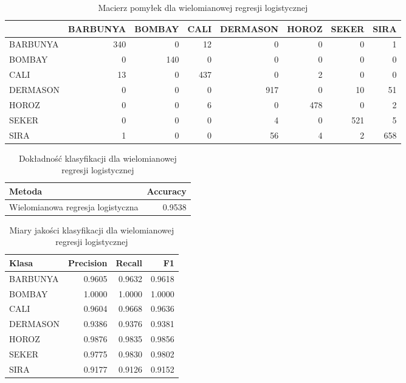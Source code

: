 \begin{table}[H]

\caption{\label{tab:conf-matrix-multinom}Macierz pomyłek dla wielomianowej regresji logistycznej}
\centering
\begin{tabular}[t]{lrrrrrrr}
\toprule
  & BARBUNYA & BOMBAY & CALI & DERMASON & HOROZ & SEKER & SIRA\\
\midrule
BARBUNYA & 340 & 0 & 12 & 0 & 0 & 0 & 1\\
BOMBAY & 0 & 140 & 0 & 0 & 0 & 0 & 0\\
CALI & 13 & 0 & 437 & 0 & 2 & 0 & 0\\
DERMASON & 0 & 0 & 0 & 917 & 0 & 10 & 51\\
HOROZ & 0 & 0 & 6 & 0 & 478 & 0 & 2\\
\addlinespace
SEKER & 0 & 0 & 0 & 4 & 0 & 521 & 5\\
SIRA & 1 & 0 & 0 & 56 & 4 & 2 & 658\\
\bottomrule
\end{tabular}
\end{table}

\begin{table}[H]

\caption{\label{tab:accuracy-multinom}Dokładność klasyfikacji dla wielomianowej regresji logistycznej}
\centering
\begin{tabular}[t]{lr}
\toprule
Metoda & Accuracy\\
\midrule
Wielomianowa regresja logistyczna & 0.9538\\
\bottomrule
\end{tabular}
\end{table}

\begin{table}[H]

\caption{\label{tab:metrics-multinom}Miary jakości klasyfikacji dla wielomianowej regresji logistycznej}
\centering
\begin{tabular}[t]{lrrr}
\toprule
Klasa & Precision & Recall & F1\\
\midrule
BARBUNYA & 0.9605 & 0.9632 & 0.9618\\
BOMBAY & 1.0000 & 1.0000 & 1.0000\\
CALI & 0.9604 & 0.9668 & 0.9636\\
DERMASON & 0.9386 & 0.9376 & 0.9381\\
HOROZ & 0.9876 & 0.9835 & 0.9856\\
\addlinespace
SEKER & 0.9775 & 0.9830 & 0.9802\\
SIRA & 0.9177 & 0.9126 & 0.9152\\
\bottomrule
\end{tabular}
\end{table}

